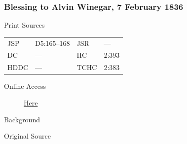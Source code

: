 		\subsubsection{Blessing to Alvin Winegar, 7 February 1836}
			\label{EMS-1836-JS-7-FEB-1836}
			
			\begin{description}
					\item[Print Sources]
				\end{description}

					\begin{tabular}{p{0.5in}p{1in}p{0.5in}p{1in}}
					JSP	 	& D5:165--168		& JSR 		& --- \\
					DC	 	& ---				& HC 		& 2:393 \\
					HDDC 	& ---				& TCHC 		& 2:383 \\
					\end{tabular}
				
				\begin{description}
					\item[Online Access] \href{https://www.josephsmithpapers.org/paper-summary/blessing-to-alvin-winegar-7-february-1836/1}{Here}
				\end{description}
				
				\begin{description}
					\item[Background]
				\end{description}
				
				
				\begin{description}
					\item[Original Source]
				\end{description}
				
				
